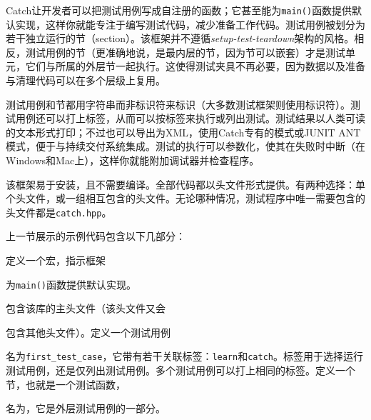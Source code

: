 
Catch让开发者可以把测试用例写成自注册的函数；它甚至能为\texttt{main()}函数提供默认实现，这样你就能专注于编写测试代码，减少准备工作代码。测试用例被划分为若干独立运行的节（section）。该框架并不遵循\textit{setup-test-teardown}架构的风格。相反，测试用例的节（更准确地说，是最内层的节，因为节可以嵌套）才是测试单元，它们与所属的外层节一起执行。这使得测试夹具不再必要，因为数据以及准备与清理代码可以在多个层级上复用。



测试用例和节都用字符串而非标识符来标识（大多数测试框架则使用标识符）。测试用例还可以打上标签，从而可以按标签来执行或列出测试。测试结果以人类可读的文本形式打印；不过也可以导出为XML，使用Catch专有的模式或JUNIT ANT模式，便于与持续交付系统集成。测试的执行可以参数化，使其在失败时中断（在Windows和Mac上），这样你就能附加调试器并检查程序。



该框架易于安装，且不需要编译。全部代码都以头文件形式提供。有两种选择：单个头文件，或一组相互包含的头文件。无论哪种情况，测试程序中唯一需要包含的头文件都是\texttt{catch.\allowbreak{}hpp}。



上一节展示的示例代码包含以下几部分：



定义一个宏，指示框架



为\texttt{main()}函数提供默认实现。



包含该库的主头文件（该头文件又会



包含其他头文件）。定义一个测试用例



名为\texttt{first\_\allowbreak{}test\_\allowbreak{}case}，它带有若干关联标签：\texttt{learn}和\texttt{catch}。标签用于选择运行测试用例，还是仅列出测试用例。多个测试用例可以打上相同的标签。定义一个节，也就是一个测试函数，



名为，它是外层测试用例的一部分。


